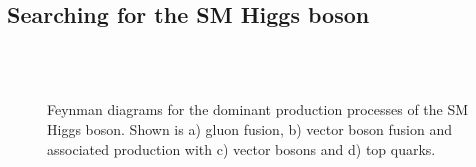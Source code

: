 \subsection{Searching for the SM Higgs boson}


\begin{figure}[htbp]
 \qquad
{} \\
  \qquad
{} \\
\caption[Feynman diagrams for the dominant production processes of the SM Higgs
boson.]{Feynman diagrams for the dominant production processes of the SM Higgs
boson. Shown is a) gluon fusion, b) vector boson fusion and
associated production with c) vector bosons and d) top quarks.}
\label{fig:SMFeynmanDiagrams}
\end{figure}

